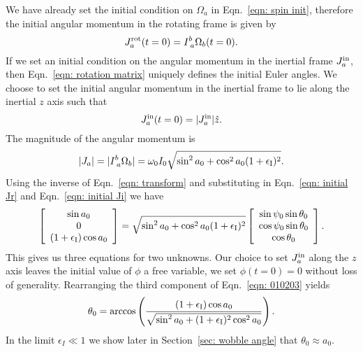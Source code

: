\documentclass[../full_thesis/full_thesis.tex]{subfiles}
\begin{document}
We have already set the initial condition on $\Omega_a$ in Eqn.~\eqref{eqn:
spin init}, therefore the initial angular momentum in the rotating frame is given by
\begin{equation}
  J^{\textrm{rot}}_a(t=0) = I^{b}_{\; a} \Omega_b(t=0).
\label{eqn: initial Jr}
\end{equation}
If we set an initial condition on the angular momentum in the inertial frame
$J^{\textrm{in}}_a$, then Eqn.~\eqref{eqn: rotation matrix} uniquely defines the initial
Euler angles. We choose to set the initial angular momentum in the inertial
frame to lie along the inertial $z$ axis such that
\begin{equation}
  J^{\textrm{in}}_a(t=0) = |J^{\textrm{in}}_a| \hat{z}.
\label{eqn: initial Ji}
\end{equation}
The magnitude of the angular momentum is
\begin{equation}
|J_a| = |I^{b}_{\; a} \Omega_{b}|=\omega_{0}I_{0}\sqrt{\sin^{2}a_{0} + \cos^{2}a_{0}(1+\epsilon_{\mathrm{I}})^2}.
\end{equation}
Using the inverse of Eqn.~\eqref{eqn: transform} and substituting in
Eqn.~\eqref{eqn: initial Jr} and Eqn.~\eqref{eqn: initial Ji} we have
\begin{equation}
\left[ \begin{array}{c}
\sin a_{0} \\
0 \\
(1+\epsilon_{\mathrm{I}})\cos a_{0}
\end{array}\right] =
\sqrt{\sin^{2} a_{0} + \cos^{2}a_{0}(1+\epsilon_{\mathrm{I}})^{2}}
\left[ \begin{array}{c}
\sin \psi_{0} \sin \theta_{0} \\
\cos \psi_{0} \sin \theta_{0} \\
\cos \theta_{0}
\end{array}\right].
\label{eqn: 010203}
\end{equation}
This gives us three equations for two unknowns. Our choice to set $J^{\textrm{in}}_a$ along
the $z$ axis leaves the initial value of $\phi$ a free variable,
we set $\phi(t=0) = 0$ without loss of generality.
Rearranging the third component of Eqn.~\eqref{eqn: 010203} yields
\begin{equation}
\theta_{0} = \arccos\left(\frac{(1+\epsilon_{\mathrm{I}})\cos a_{0}}{ \sqrt{\sin^{2}
        a_{0} + (1+\epsilon_{\mathrm{I}})^{2}\cos^{2} a_{0}}} \right).
\label{eqn: theta init}
\end{equation}
In the limit $\epsilon_{I} \ll 1$ we show later in Section~\ref{sec: wobble
angle} that $\theta_{0} \approx a_{0}$.
\end{document}
